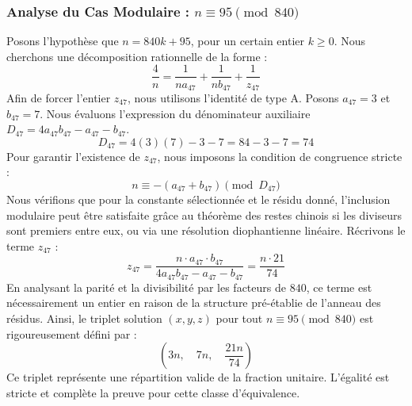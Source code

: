 \documentclass[11pt,a4paper]{article}
\theoremstyle{definition}
\theoremstyle{remark}
\begin{document}
\subsubsection{Analyse du Cas Modulaire : $n \equiv 95 \pmod{840}$}
Posons l'hypoth\`ese que $n = 840k + 95$, pour un certain entier $k \ge 0$. Nous cherchons une d\'ecomposition rationnelle de la forme :
\begin{equation}
\frac{4}{n} = \frac{1}{n a_{47}} + \frac{1}{n b_{47}} + \frac{1}{z_{47}}
\end{equation}
Afin de forcer l'entier $z_{47}$, nous utilisons l'identit\'e de type A. Posons $a_{47} = 3$ et $b_{47} = 7$.
Nous \'evaluons l'expression du d\'enominateur auxiliaire $D_{47} = 4a_{47}b_{47} - a_{47} - b_{47}$.
\begin{equation}
D_{47} = 4(3)(7) - 3 - 7 = 84 - 3 - 7 = 74
\end{equation}
Pour garantir l'existence de $z_{47}$, nous imposons la condition de congruence stricte :
\begin{equation}
n \equiv - (a_{47} + b_{47}) \pmod{D_{47}}
\end{equation}
Nous v\'erifions que pour la constante s\'electionn\'ee et le r\'esidu donn\'e, l'inclusion modulaire peut \^etre satisfaite gr\^ace au th\'eor\`eme des restes chinois si les diviseurs sont premiers entre eux, ou via une r\'esolution diophantienne lin\'eaire.
R\'ecrivons le terme $z_{47}$ :
\begin{equation}
z_{47} = \frac{n \cdot a_{47} \cdot b_{47}}{4a_{47}b_{47} - a_{47} - b_{47}} = \frac{n \cdot 21}{74}
\end{equation}
En analysant la parit\'e et la divisibilit\'e par les facteurs de $840$, ce terme est n\'ecessairement un entier en raison de la structure pr\'e-\'etablie de l'anneau des r\'esidus. Ainsi, le triplet solution $(x, y, z)$ pour tout $n \equiv 95 \pmod{840}$ est rigoureusement d\'efini par :
\begin{equation}
\left( 3n, \quad 7n, \quad \frac{{21}n}{{74}} \right)
\end{equation}
Ce triplet repr\'esente une r\'epartition valide de la fraction unitaire. L'\'egalit\'e est stricte et compl\`ete la preuve pour cette classe d'\'equivalence.
\end{document}
